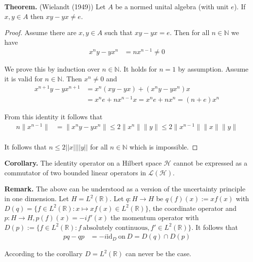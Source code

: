 \documentclass[12pt]{article}
\theoremstyle{definition}
\theoremstyle{plain}
\begin{document}
\textbf{Theorem.} (Wielandt (1949)) Let $A$ be a normed unital algebra (with unit $e$). If $x, y \in A$ then $xy - yx \not= e$.

\begin{proof}
Assume there are $x,y \in A$ such that $xy - yx = e$. Then for all $n \in \mathbb{N}$ we have 
\begin{align*}
x^n y - y x^n &= n x^{n-1} \not= 0
\end{align*}

We prove this by induction over $n \in \mathbb{N}$. It holds for $n = 1$ by assumption. Assume it is valid for $n \in \mathbb{N}$. Then $x^n \not= 0$ and
\begin{align*}
x^{n+1} y - y x^{n+1} &= x^n (x y - y x) + (x^n y - y x^n) x \\
&= x^n e + n x^{n-1} x = x^n e + n x^n = (n+e) x^n
\end{align*}

From this identity it follows that
\begin{align*}
n \|x^{n-1}\| &= \|x^n y - y x^n\| \leq 2 \|x^n\| \|y\| \leq 2 \|x^{n-1}\| \|x\| \|y\| \\
\end{align*}

It follows that $n \leq 2 ||x|| ||y||$ for all $n \in \mathbb{N}$ which is impossible. 
\end{proof}


\textbf{Corollary.} The identity operator on a Hilbert space $\mathcal{H}$ cannot be expressed as a commutator of two bounded linear operators in $\mathcal{L}(\mathcal{H})$.


\textbf{Remark.} The above can be understood as a version of the uncertainty principle in one dimension. Let $H = L^2(\mathbb{R})$. Let $q \colon H \to H$ be $q(f)(x) := xf(x)$ with $D(q) = \{f \in L^2(\mathbb{R}) : x \mapsto x f(x) \in L^2(\mathbb{R})\}$, the coordinate operator and $p \colon H \to H, p(f)(x) = -i f'(x)$ the momentum operator with $D(p) := \{f \in L^2(\mathbb{R}) : f \ \text{absolutely \ continuous}, f' \in L^2(\mathbb{R})\}$. It follows that 
\begin{align*}
pq - qp &= -i \mathrm{id}_D \ \text{on} \ D = D(q) \cap D(p) 
\end{align*}

According to the corollary $D = L^2(\mathbb{R})$ can never be the case.

\end{document}
